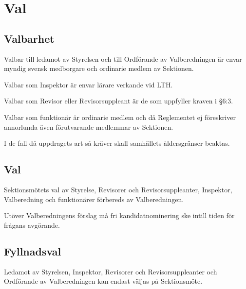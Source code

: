\documentclass[10pt]{article}
\begin{document}
    
    
    
    
    \section{Val}
    \subsection{Valbarhet}
    Valbar till ledamot av Styrelsen och till Ordförande av Valberedningen är envar myndig svensk medborgare och ordinarie medlem av Sektionen.
    
    Valbar som Inspektor är envar lärare verkande vid LTH.
    
    Valbar som Revisor eller Revisorsuppleant är de som uppfyller kraven i §6:3.
    
    Valbar som funktionär är ordinarie medlem och då Reglementet ej föreskriver
    annorlunda även förutvarande medlemmar av Sektionen.
    
    I de fall då uppdragets art så kräver skall samhällets åldersgränser beaktas.
    
    \subsection{Val}
    Sektionsmötets val av Styrelse, Revisorer och
    Revisorsuppleanter, Inspektor, Valberedning och funktionärer förbereds av
    Valberedningen.
    
    Utöver Valberedningens förslag må fri kandidatnominering ske intill tiden
    för frågans avgörande.
    
    \subsection{Fyllnadsval}
    Ledamot av Styrelsen, Inspektor, Revisorer och Revisorsuppleanter och
    Ordförande av Valberedningen kan endast väljas på
    Sektionsmöte.
    
\end{document}
